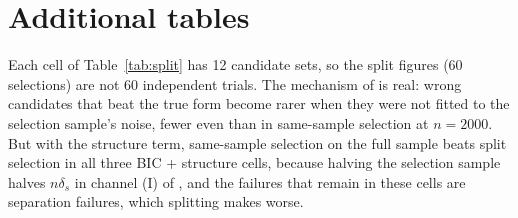 \section{Additional tables}
\label{app:tables}

\begin{table}[ht]
\centering\footnotesize
\setlength{\tabcolsep}{4pt}
\caption{ in the data: the same candidates (D1 strong, $n = 1000$ fronts, 12 seeds) selected on the sample they were fitted to, on five fresh samples of $n = 1000$ each, and, as the full-sample reference, same-sample selection at $n = 2000$ on fronts generated at $n = 2000$. Beaters are wrong candidates whose score beats the true form's, per run: same-sample 1000 / split / same-sample 2000.}
\label{tab:split}
\end{table}

Each cell of Table~\ref{tab:split} has 12 candidate sets, so the split figures (60 selections) are not 60 independent trials. The mechanism of  is real: wrong candidates that beat the true form become rarer when they were not fitted to the selection sample's noise, fewer even than in same-sample selection at $n = 2000$. But with the structure term, same-sample selection on the full sample beats split selection in all three BIC + structure cells, because halving the selection sample halves $n\delta_s$ in channel (I) of , and the failures that remain in these cells are separation failures, which splitting makes worse.


